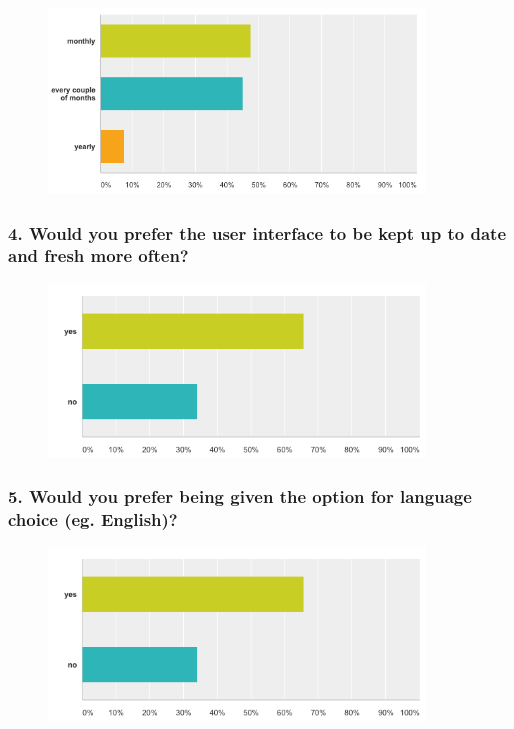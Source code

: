 \begin{figure}[!h]
    \centering
    \includegraphics[width=100mm]{images/survey/time}
    \label{fig:label}
\end{figure}


\subsubsection{4. Would you prefer the user interface to be kept up to date and fresh more often?}

\begin{figure}[!h]
    \centering
    \includegraphics[width=100mm]{images/survey/updates}
    \label{fig:label}
\end{figure}

\subsubsection{5. Would you prefer being given the option for language choice (eg. English)?}

\begin{figure}[!h]
    \centering
    \includegraphics[width=100mm]{images/survey/language}
    \label{fig:label}
\end{figure}


